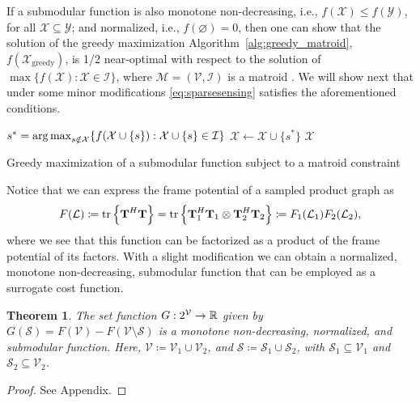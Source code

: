 \documentclass{article}
\newtheorem{theorem}{Theorem}
\begin{document}
If a submodular function is also monotone non-decreasing, i.e., $f(\mathcal{X})\leq f(\mathcal{Y})$, for all $\mathcal{X}\subseteq\mathcal{Y}$; and normalized, i.e., $f(\varnothing)=0$, then one can show that the solution of the greedy maximization Algorithm~\ref{alg:greedy_matroid}, $f(\mathcal{X}_\text{greedy})$, is 1/2 near-optimal with respect to the solution of $\max\{f(\mathcal{X}): \mathcal{X}\in\mathcal{I}\}$, where $\mathcal{M}=(\mathcal{V},\mathcal{I})$ is a matroid \cite{submodular_2}. We will show next that under some minor modifications \eqref{eq:sparsesensing} satisfies the aforementioned conditions.

\begin{algorithm}[t]
\begin{algorithmic}[1]
\STATE $s^*=\operatorname*{arg\,max}_{s\notin\mathcal{X}}\{f(\mathcal{X}\cup\{s\}):\mathcal{X}\cup\{s\}\in\mathcal{I}\}$ 
\STATE $\mathcal{X}\leftarrow\mathcal{X}\cup\{s^*\}$
\ENDFOR
\RETURN $\mathcal{X}$
\end{algorithmic}
\caption{Greedy maximization of a submodular function subject to a matroid constraint}
\label{alg:greedy_matroid}
\end{algorithm}

Notice that we can express the frame potential of a sampled product graph as
\begin{equation*}
	F(\mathcal{L})\coloneqq\mathrm{tr}\left\{\boldsymbol{\mathrm{T}}^H\boldsymbol{\mathrm{T}}\right\}
	=\mathrm{tr}\left\{\boldsymbol{\mathrm{T}}_1^H\boldsymbol{\mathrm{T}}_1\otimes\boldsymbol{\mathrm{T}}_2^H\boldsymbol{\mathrm{T}}_2\right\}\coloneqq F_1(\mathcal{L}_1)F_2(\mathcal{L}_2),
\end{equation*}
where we see that this function can be factorized as a product of the frame potential of its factors. With a slight modification we can obtain a normalized, monotone non-decreasing, submodular function that can be employed as a surrogate cost function.

\begin{theorem}\label{thm:submodular_F}
	The set function $G:2^\mathcal{V}\rightarrow\mathbb{R}$ given by $G(\mathcal{S})=F(\mathcal{V})-F(\mathcal{V}\setminus\mathcal{S})$ is a monotone non-decreasing, normalized, and submodular function. Here, $\mathcal{V}\coloneqq\mathcal{V}_1\cup\mathcal{V}_2$,  and $\mathcal{S}\coloneqq\mathcal{S}_1\cup\mathcal{S}_2$, with $\mathcal{S}_1\subseteq\mathcal{V}_1$ and $\mathcal{S}_2\subseteq\mathcal{V}_2$.
\end{theorem}
\begin{proof}
	See Appendix.
\end{proof}
\end{document}

